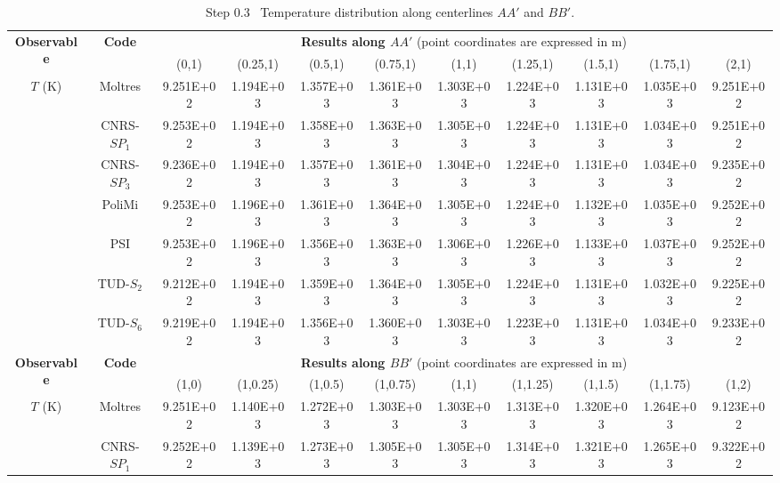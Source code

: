 \begin{table}[htbp!]
	\caption{Step 0.3 \textemdash\ Temperature distribution along centerlines $AA'$ and $BB'$.}
	\label{table:0.3}
	\centering
	\footnotesize
	\setlength\tabcolsep{1.5pt}
	\hspace*{-2cm}
	\renewcommand{\arraystretch}{.8}
	\begin{tabular}{c c c c c c c c c c c}
		\toprule
		\multirow{2}{*}{\textbf{Observable}} & \multirow{2}{*}{\textbf{Code}} & \multicolumn{9}{c}{\textbf{Results along $AA'$} (point coordinates are expressed in m)} \\
		& & {(0,1)} & {(0.25,1)} & {(0.5,1)} & {(0.75,1)} & {(1,1)} & {(1.25,1)} & {(1.5,1)} & {(1.75,1)} & {(2,1)} \\
		\midrule
		\multirow{7}{*}{$T$ (K)} & Moltres & 9.251E+02 & 1.194E+03 & 1.357E+03 & 1.361E+03 &
		1.303E+03 & 1.224E+03 & 1.131E+03 & 1.035E+03 & 9.251E+02 \\
		& CNRS-$SP_1$ & 9.253E+02 & 1.194E+03 & 1.358E+03 & 1.363E+03 & 1.305E+03 & 1.224E+03 & 1.131E+03 & 1.034E+03 & 9.251E+02 \\
		& CNRS-$SP_3$ & 9.236E+02 & 1.194E+03 & 1.357E+03 & 1.361E+03 & 1.304E+03 & 1.224E+03 & 1.131E+03 & 1.034E+03 & 9.235E+02 \\
		& PoliMi & 9.253E+02 & 1.196E+03 & 1.361E+03 & 1.364E+03 & 1.305E+03 & 1.224E+03 & 1.132E+03 & 1.035E+03 & 9.252E+02 \\
		& PSI & 9.253E+02 & 1.196E+03 & 1.356E+03 & 1.363E+03 & 1.306E+03 & 1.226E+03 & 1.133E+03 & 1.037E+03 & 9.252E+02 \\
		& TUD-$S_2$ & 9.212E+02 & 1.194E+03 & 1.359E+03 & 1.364E+03 & 1.305E+03 & 1.224E+03 & 1.131E+03 & 1.032E+03 & 9.225E+02 \\
		& TUD-$S_6$ & 9.219E+02 & 1.194E+03 & 1.356E+03 & 1.360E+03 & 1.303E+03 & 1.223E+03 & 1.131E+03 & 1.034E+03 & 9.233E+02 \\
		\midrule
		\midrule
		\multirow{2}{*}{\textbf{Observable}} & \multirow{2}{*}{\textbf{Code}} & \multicolumn{9}{c}{\textbf{Results along $BB'$} (point coordinates are expressed in m)} \\
		& & {(1,0)} & {(1,0.25)} & {(1,0.5)} & {(1,0.75)} & {(1,1)} & {(1,1.25)} & {(1,1.5)} & {(1,1.75)} & {(1,2)} \\
		\midrule
		\multirow{7}{*}{$T$ (K)} & Moltres & 9.251E+02 & 1.140E+03 & 1.272E+03 & 1.303E+03 &
		1.303E+03 & 1.313E+03 & 1.320E+03 & 1.264E+03 & 9.123E+02 \\
		& CNRS-$SP_1$ & 9.252E+02 & 1.139E+03 & 1.273E+03 & 1.305E+03 & 1.305E+03 & 1.314E+03 & 1.321E+03 & 1.265E+03 & 9.322E+02 \\

\end{tabular}
\end{table}
